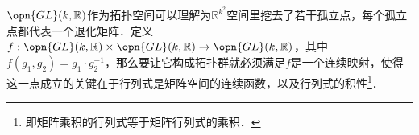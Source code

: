 $\opn{GL}(k, \mathbb{R})$作为拓扑空间可以理解为$\mathbb{R}^{k^2}$空间里挖去了若干孤立点，每个孤立点都代表一个退化矩阵．定义$f:\opn{GL}(k, \mathbb{R})\times\opn{GL}(k, \mathbb{R})\to\opn{GL}(k, \mathbb{R})$，其中$f(g_1, g_2)=g_1\cdot g_2^{-1}$，那么要让它构成拓扑群就必须满足$f$是一个连续映射，使得这一点成立的关键在于行列式是矩阵空间的连续函数，以及行列式的积性\footnote{即矩阵乘积的行列式等于矩阵行列式的乘积．}．








